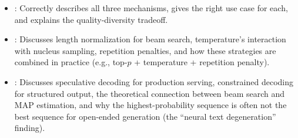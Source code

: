 \begin{interviewq}

\goodgreat
\begin{itemize}
    \item {}: Correctly describes all three mechanisms, gives the
          right use case for each, and explains the quality-diversity tradeoff.
    \item {}: Discusses length normalization for beam search,
          temperature's interaction with nucleus sampling, repetition penalties,
          and how these strategies are combined in practice (e.g., top-$p$ +
          temperature + repetition penalty).
    \item {}: Discusses speculative decoding for production
          serving, constrained decoding for structured output, the theoretical
          connection between beam search and MAP estimation, and why the
          highest-probability sequence is often not the best sequence for
          open-ended generation (the ``neural text degeneration'' finding).
\end{itemize}

\end{interviewq}

\vspace{0.5em}

